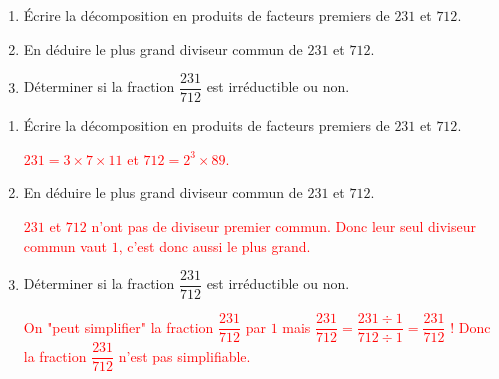 \begin{exercice*}
    \begin{enumerate}
        \item Écrire la décomposition en produits de facteurs premiers de $231$ et $712$.
        \item En déduire le plus grand diviseur commun de $231$ et $712$.
        \item Déterminer si la fraction $\dfrac{231}{712}$ est irréductible ou non.
    \end{enumerate}    
\end{exercice*}
\begin{corrige}
        \begin{enumerate}
            \item Écrire la décomposition en produits de facteurs premiers de $231$ et $712$.
            
            \textcolor{red}{
                $231=3\times 7\times 11$ et $712= 2^3\times 89$.
            }      
            \item En déduire le plus grand diviseur commun de $231$ et $712$.
            
            \textcolor{red}{
                $231$ et $712$ n'ont pas de diviseur premier commun. Donc leur seul diviseur commun vaut $1$, c'est donc aussi le plus grand.
            }        
            \item Déterminer si la fraction $\dfrac{231}{712}$ est irréductible ou non.
            
            \textcolor{red}{
                On "peut simplifier" la fraction $\dfrac{231}{712}$ par $1$ mais $\dfrac{231}{712} = \dfrac{231\div 1}{712\div 1} = \dfrac{231}{712}$ !
                Donc la fraction $\dfrac{231}{712}$ n'est pas simplifiable.
            }       
        \end{enumerate}                    
\end{corrige}

